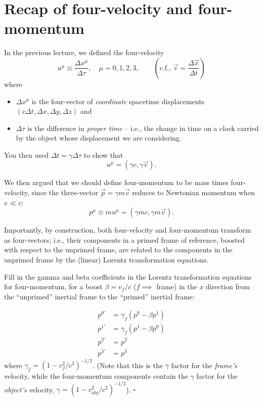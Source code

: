 \documentclass[11pt, letterpaper, openany]{book}
\newenvironment{exercise}[1][Exercise]{%
  \tcolorbox[blanker, breakable, left=1em,
    before skip=1em, after skip=1em,
    borderline west={3pt}{0pt}{PhysNavy},
    colback=PhysCream,
    before upper={\textcolor{PhysNavy}{\sffamily\bfseries #1:}\space}
  ]%
}{%
  \endtcolorbox%
}
\newenvironment{solution}[1][Solution]{%
  \tcolorbox[blanker, breakable, left=1em,
    before skip=1em, after skip=1em,
    borderline west={2pt}{0pt}{PhysTeal},
    colback=PhysCream,
    before upper={\textcolor{PhysTeal}{\sffamily\bfseries #1.}\space}
  ]%
}{%
  \hfill\textcolor{PhysTeal}{\ensuremath{\square}}\endtcolorbox%
}
\begin{document}
\section{Recap of four-velocity and four-momentum}

In the previous lecture, we defined the four-velocity
\[ u^\mu \equiv \frac{\Delta x^\mu}{\Delta \tau}, \quad \mu = 0, 1, 2, 3, \qquad (\text{c.f., } \vec{v} = \frac{\Delta \vec{x}}{\Delta t}) \]
where
\begin{itemize}
    \item $\Delta x^\mu$ is the four-vector of \textit{coordinate} spacetime displacements $(c\Delta t, \Delta x, \Delta y, \Delta z)$ and
    \item $\Delta \tau$ is the difference in \textit{proper time} -- i.e., the change in time on a clock carried by the object whose displacement we are considering.
\end{itemize}

You then used $\Delta t = \gamma \Delta \tau$ to show that
\[ u^\mu = (\gamma c, \gamma \vec{v}). \]

We then argued that we should define four-momentum to be mass times four-velocity, since the three-vector $\vec{p} = \gamma m\vec{v}$ reduces to Newtonian momentum when $v \ll c$:
\[ p^\mu \equiv m u^\mu = (\gamma mc, \gamma m\vec{v}). \]

Importantly, by construction, both four-velocity and four-momentum transform as four-vectors; i.e., their components in a primed frame of reference, boosted with respect to the unprimed frame, are related to the components in the unprimed frame by the (linear) Lorentz transformation equations.

\begin{exercise}[Exercise 1]
Fill in the gamma and beta coefficients in the Lorentz transformation equations for four-momentum, for a boost $\beta = v_f/c$ ($f \implies$ frame) in the $x$ direction from the ``unprimed'' inertial frame to the ``primed'' inertial frame:
\end{exercise}
\begin{solution}
\begin{align*}
    p^{0'} &= \gamma_f(p^0 - \beta p^1) \\
    p^{1'} &= \gamma_f(p^1 - \beta p^0) \\
    p^{2'} &= p^2 \\
    p^{3'} &= p^3
\end{align*}
where $\gamma_f = (1 - v_f^2/c^2)^{-1/2}$. (Note that this is the $\gamma$ factor for the \textit{frame's} velocity, while the four-momentum components contain the $\gamma$ factor for the \textit{object's} velocity, $\gamma = (1 - v_{\text{obj}}^2/c^2)^{-1/2}$).
\end{solution}
\end{document}
